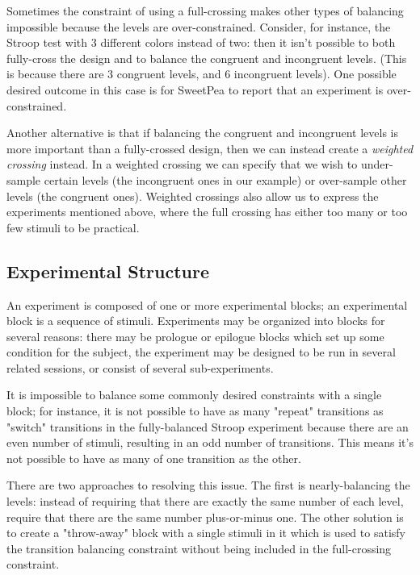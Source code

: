 Sometimes the constraint of using a full-crossing makes other types of balancing impossible because the levels are over-constrained. Consider, for instance, the Stroop test with 3 different colors instead of two: then it isn't possible to both fully-cross the design and to balance the congruent and incongruent levels. (This is because there are 3 congruent levels, and 6 incongruent levels). One possible desired outcome in this case is for SweetPea to report that an experiment is over-constrained.

Another alternative is that if balancing the congruent and incongruent levels is more important than a fully-crossed design, then we can instead create a \emph{weighted crossing} instead. In a weighted crossing we can specify that we wish to under-sample certain levels (the incongruent ones in our example) or over-sample other levels (the congruent ones). Weighted crossings also allow us to express the experiments mentioned above, where the full crossing has either too many or too few stimuli to be practical.

\subsection{Experimental Structure}

An experiment is composed of one or more experimental blocks; an experimental block is a sequence of stimuli. Experiments may be organized into blocks for several reasons: there may be prologue or epilogue blocks which set up some condition for the subject, the experiment may be designed to be run in several related sessions, or consist of several sub-experiments.

It is impossible to balance some commonly desired constraints with a single block; for instance, it is not possible to have as many "repeat" transitions as "switch" transitions in the fully-balanced Stroop experiment because there are an even number of stimuli, resulting in an odd number of transitions. This means it's not possible to have as many of one transition as the other.

There are two approaches to resolving this issue. The first is nearly-balancing the levels: instead of requiring that there are exactly the same number of each level, require that there are the same number plus-or-minus one. The other solution is to create a "throw-away" block with a single stimuli in it which is used to satisfy the transition balancing constraint without being included in the full-crossing constraint.


